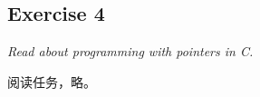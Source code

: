\documentclass[12pt, letterpaper]{report}
\begin{document}



\subsection{Exercise 4}
\textsl{Read about programming with pointers in C.}\par 
\quad \par
阅读任务，略。
\end{document}
